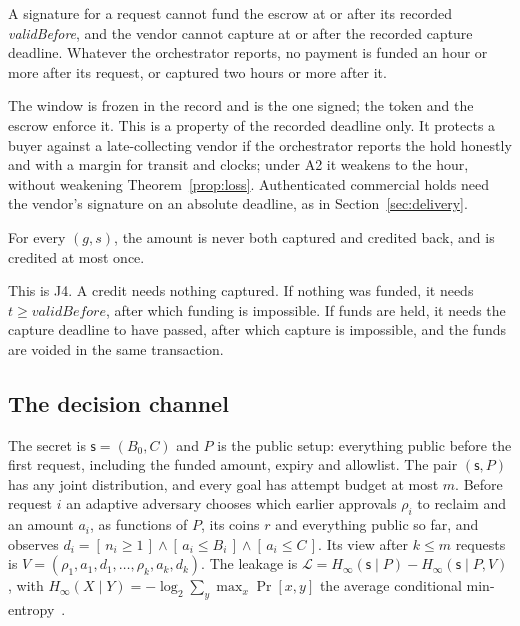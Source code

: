 \begin{property}\label{prop:hold}
A signature for a request cannot fund the escrow at or after its recorded \textit{validBefore}, and the vendor cannot capture at or after the
recorded capture deadline. Whatever the orchestrator reports, no payment is funded an hour or more after its request, or captured two hours or
more after it.
\end{property}

\noindent The window is frozen in the record and is the one signed; the token and the escrow enforce it. This is a property of the recorded
deadline only. It protects a buyer against a late-collecting vendor if the orchestrator reports the hold honestly and with a margin for transit and
clocks; under A2 it weakens to the hour, without weakening Theorem~\ref{prop:loss}. Authenticated commercial holds need the vendor's signature on
an absolute deadline, as in Section~\ref{sec:delivery}.

\begin{property}\label{prop:reclaim}
For every $(g, s)$, the amount is never both captured and credited back, and is credited at most once.
\end{property}

\noindent This is J4. A credit needs nothing captured. If nothing was funded, it needs $t \ge \mathit{validBefore}$, after which funding is
impossible. If funds are held, it needs the capture deadline to have passed, after which capture is impossible, and the funds are voided in the
same transaction.

\subsection{The decision channel}
\label{sec:leakthm}

\begin{definition}\label{def:leak}
The secret is $\mathsf{s} = (B_0, C)$ and $P$ is the public setup: everything public before the first request, including the funded amount,
expiry and allowlist. The pair $(\mathsf{s}, P)$ has any joint distribution, and every goal has attempt budget at most $m$. Before request $i$ an
adaptive adversary chooses which earlier approvals $\rho_i$ to reclaim and an amount $a_i$, as functions of $P$, its coins $r$ and everything
public so far, and observes $d_i = [\,n_i \ge 1\,] \wedge [\,a_i \le B_i\,] \wedge [\,a_i \le C\,]$. Its view after $k \le m$ requests is
$V = (\rho_1, a_1, d_1, \ldots, \rho_k, a_k, d_k)$. The leakage is $\mathcal{L} = H_\infty(\mathsf{s} \mid P) - H_\infty(\mathsf{s} \mid P, V)$, with
$H_\infty(X \mid Y) = -\log_2 \sum_y \max_x \Pr[x, y]$ the average conditional min-entropy~\cite{smith2009}.
\end{definition}

